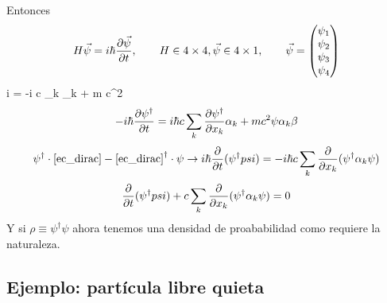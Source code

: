 \documentclass[10pt,oneside]{CBFT_book}
\begin{document}
Entonces
\[
	H \vec{\psi} = i \hbar \frac{\partial^{\hspace{-0.05em}} {\vec{\psi}}}{\partial {t}^{\hspace{-0.05em}}}, \qquad H \in 4\times 4, \vec{\psi} \in 4\times 1, \qquad
	\vec{\psi} = \begin{pmatrix} \psi_1 \\ \psi_2 \\ \psi_3 \\ \psi_4 \end{pmatrix}
\]
\be \label{ec_dirac}
	i \hbar {} = -i \hbar c \sum_k \alpha_k  + m c^2 \beta \psi
\ee
\[
	-i \hbar \frac{\partial^{\hspace{-0.05em}} {\psi^\dagger}}{\partial {t}^{\hspace{-0.05em}}} = i \hbar c \sum_k \frac{\partial^{\hspace{-0.05em}} {\psi^\dagger}}{\partial {x_k}^{\hspace{-0.05em}}}\alpha_k + m c^2\psi\alpha_k\beta
\]
\[
	\psi^\dagger\cdot\eqref{ec_dirac} - \eqref{ec_dirac}^\dagger\cdot \psi \rightarrow 
	i\hbar \frac{\partial^{\hspace{-0.05em}} {}}{\partial {t}^{\hspace{-0.05em}}}(\psi^\dagger psi) = -i\hbar c \sum_k \frac{\partial^{\hspace{-0.05em}} {}}{\partial {x_k}^{\hspace{-0.05em}}}(\psi^\dagger \alpha_k \psi)
\]
\[
	\frac{\partial^{\hspace{-0.05em}} {}}{\partial {t}^{\hspace{-0.05em}}}(\psi^\dagger psi) + c \sum_k \frac{\partial^{\hspace{-0.05em}} {}}{\partial {x_k}^{\hspace{-0.05em}}}(\psi^\dagger \alpha_k \psi) = 0
\]
Y si $\rho \equiv \psi^\dagger\psi$ ahora tenemos una densidad de proababilidad como requiere la naturaleza.

\subsection{Ejemplo: partícula libre quieta}
\end{document}
